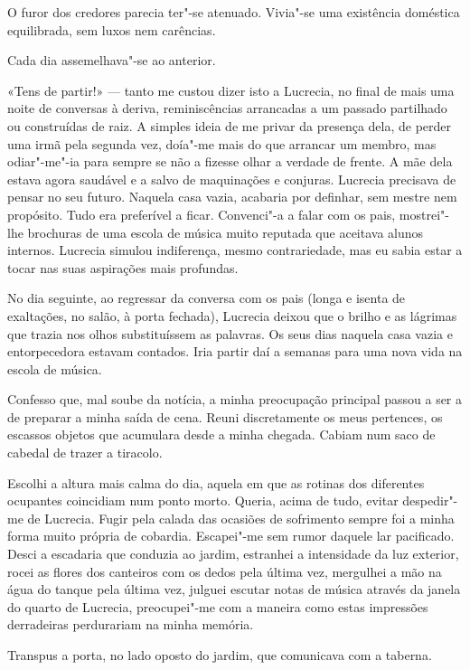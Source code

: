 O furor dos credores parecia ter"-se atenuado. Vivia"-se uma existência
doméstica equilibrada, sem luxos nem carências.

Cada dia assemelhava"-se ao anterior.

«Tens de partir!» --- tanto me custou dizer isto a Lucrecia, no final de
mais uma noite de conversas à deriva, reminiscências arrancadas a um
passado partilhado ou construídas de raiz. A simples ideia de me privar
da presença dela, de perder uma irmã pela segunda vez, doía"-me mais do
que arrancar um membro, mas odiar"-me"-ia para sempre se não a fizesse
olhar a verdade de frente. A mãe dela estava agora saudável e a salvo de
maquinações e conjuras. Lucrecia precisava de pensar no seu futuro.
Naquela casa vazia, acabaria por definhar, sem
mestre nem propósito. Tudo era preferível a ficar. Convenci"-a a falar
com os pais, mostrei"-lhe brochuras de uma escola de música muito
reputada que aceitava alunos internos. Lucrecia simulou indiferença,
mesmo contrariedade, mas eu sabia estar a tocar nas suas aspirações mais
profundas.

No dia seguinte, ao regressar da conversa com os pais (longa e isenta de
exaltações, no salão, à porta fechada), Lucrecia deixou que o brilho e
as lágrimas que trazia nos olhos substituíssem as palavras. Os seus dias
naquela casa vazia e entorpecedora estavam contados. Iria partir daí a
semanas para uma nova vida na escola de música.

Confesso que, mal soube da notícia, a minha preocupação principal passou
a ser a de preparar a minha saída de cena. Reuni discretamente os meus
pertences, os escassos objetos que acumulara desde a minha chegada.
Cabiam num saco de cabedal de trazer a tiracolo.

Escolhi a altura mais calma do dia, aquela em que as rotinas dos
diferentes ocupantes coincidiam num ponto morto. Queria, acima de tudo,
evitar despedir"-me de Lucrecia. Fugir pela calada das ocasiões de
sofrimento sempre foi a minha forma muito própria de cobardia.
Escapei"-me sem rumor daquele lar pacificado. Desci a escadaria que
conduzia ao jardim, estranhei a intensidade da luz exterior, rocei as
flores dos canteiros com os dedos pela última vez, mergulhei a mão na
água do tanque pela última vez, julguei escutar notas de música
através da janela do quarto de Lucrecia, preocupei"-me com a maneira como
estas impressões derradeiras perdurariam na minha memória.

Transpus a porta, no lado oposto do jardim, que comunicava com a
taberna.

